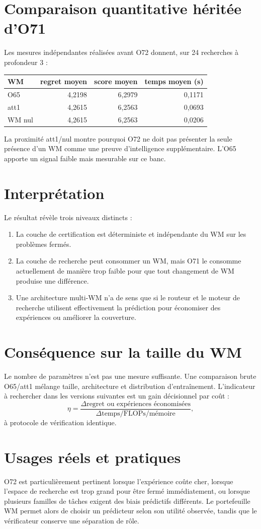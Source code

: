 \documentclass[11pt,a4paper]{article}
\begin{document}
\section{Comparaison quantitative héritée d'O71}
Les mesures indépendantes réalisées avant O72 donnent, sur 24 recherches à profondeur 3 :
\begin{center}\begin{tabular}{lrrr}\toprule WM & regret moyen & score moyen & temps moyen (s)\\\midrule O65 & 4,2198 & 6,2979 & 0,1171\\ att1 & 4,2615 & 6,2563 & 0,0693\\ WM nul & 4,2615 & 6,2563 & 0,0206\\\bottomrule\end{tabular}\end{center}
La proximité att1/nul montre pourquoi O72 ne doit pas présenter la seule présence d'un WM comme une preuve d'intelligence supplémentaire. L'O65 apporte un signal faible mais mesurable sur ce banc.
\section{Interprétation}
Le résultat révèle trois niveaux distincts :
\begin{enumerate}
\item La couche de certification est déterministe et indépendante du WM sur les problèmes fermés.
\item La couche de recherche peut consommer un WM, mais O71 le consomme actuellement de manière trop faible pour que tout changement de WM produise une différence.
\item Une architecture multi-WM n'a de sens que si le routeur et le moteur de recherche utilisent effectivement la prédiction pour économiser des expériences ou améliorer la couverture.
\end{enumerate}
\section{Conséquence sur la taille du WM}
Le nombre de paramètres n'est pas une mesure suffisante. Une comparaison brute O65/att1 mélange taille, architecture et distribution d'entraînement. L'indicateur à rechercher dans les versions suivantes est un gain décisionnel par coût :
\[
\eta=\frac{\Delta\text{regret ou expériences économisées}}{\Delta\text{temps/FLOPs/mémoire}},
\]
à protocole de vérification identique.
\section{Usages réels et pratiques}
O72 est particulièrement pertinent lorsque l'expérience coûte cher, lorsque l'espace de recherche est trop grand pour être fermé immédiatement, ou lorsque plusieurs familles de tâches exigent des biais prédictifs différents. Le portefeuille WM permet alors de choisir un prédicteur selon son utilité observée, tandis que le vérificateur conserve une séparation de rôle.
\end{document}
